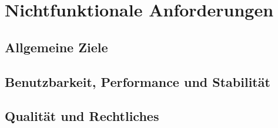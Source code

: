 \section{Nichtfunktionale Anforderungen}

\subsection{Allgemeine Ziele}
%

\subsection{Benutzbarkeit, Performance und Stabilität}
%

\subsection{Qualität und Rechtliches}
%
